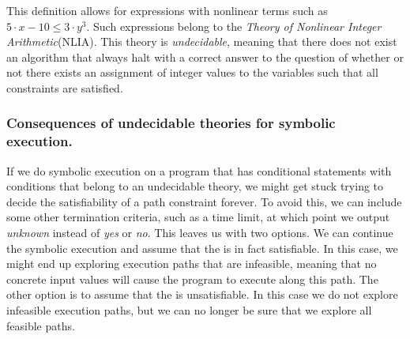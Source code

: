 	This definition allows for expressions with nonlinear terms such as $ 5\cdot x - 10 \leq 3 \cdot y^3$. Such expressions belong to the \emph{Theory of Nonlinear Integer Arithmetic}(NLIA). This theory is \emph{undecidable}, meaning that there does not exist an algorithm that always halt with a correct answer to the question of whether or not there exists an assignment of integer values to the variables such that all constraints are satisfied. 
	
	\subsubsection{Consequences of undecidable theories for symbolic execution.}
	If we do symbolic execution on a program that has conditional statements with conditions that belong to an undecidable theory, we might get stuck trying to decide the satisfiability of a path constraint forever. To avoid this, we can include some other termination criteria, such as a time limit, at which point we output \emph{unknown} instead of \emph{yes} or \emph{no}. This leaves us with two options. We can continue the symbolic execution and assume that the \pc is in fact satisfiable. In this case, we might end up exploring execution paths that are infeasible, meaning that no concrete input values will cause the program to execute along this path. The other option is to assume that the \pc is unsatisfiable. In this case we do not explore infeasible execution paths, but we can no longer be sure that we explore all feasible paths.